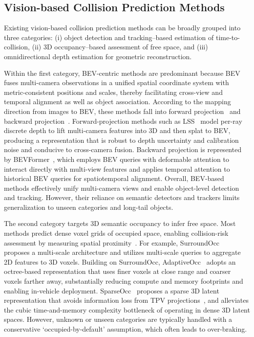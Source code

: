 \documentclass[journal]{IEEEtran}
\begin{document}
\subsection{Vision-based Collision Prediction Methods}
\label{sec:related-work1}
Existing vision-based collision prediction methods can be broadly grouped into three categories: (i) object detection and tracking–based estimation of time-to-collision, (ii) 3D occupancy–based assessment of free space, and (iii) omnidirectional depth estimation for geometric reconstruction. 

Within the first category, BEV-centric methods are predominant because BEV fuses multi-camera observations in a unified spatial coordinate system with metric-consistent positions and scales, thereby facilitating cross-view and temporal alignment as well as object association. According to the mapping direction from images to BEV, these methods fall into forward projection~\cite{philion2020lss,huang2021bevdet,huang2022bevdet4d,li2023bevdepth,li2023bevstereo,li2024fast} and backward projection~\cite{wang2022detr3d,doll2022spatialdetr,liu2022petr,li2024bevformer}. Forward-projection methods such as LSS~\cite{philion2020lss} model per-ray discrete depth to lift multi-camera features into 3D and then splat to BEV, producing a representation that is robust to depth uncertainty and calibration noise and conducive to cross-camera fusion. Backward projection is represented by BEVFormer~\cite{li2024bevformer}, which employs BEV queries with deformable attention to interact directly with multi-view features and applies temporal attention to historical BEV queries for spatiotemporal alignment. Overall, BEV-based methods effectively unify multi-camera views and enable object-level detection and tracking. However, their reliance on semantic detectors and trackers limits generalization to unseen categories and long-tail objects. 

The second category targets 3D semantic occupancy to infer free space. Most methods predict dense voxel grids of occupied space, enabling collision-risk assessment by measuring spatial proximity~\cite{wei2023surroundocc,yang2024adaptiveocc,li2023fb,huang2023tri,tang2024sparseocc,hou2024fastocc}. For example, SurroundOcc~\cite{wei2023surroundocc} proposes a multi-scale architecture and utilizes multi-scale queries to aggregate 2D features to 3D voxels. Building on SurroundOcc, AdaptiveOcc~\cite{yang2024adaptiveocc} adopts an octree-based representation that uses finer voxels at close range and coarser voxels farther away, substantially reducing compute and memory footprints and enabling in-vehicle deployment. SparseOcc~\cite{tang2024sparseocc} proposes a sparse 3D latent representation that avoids information loss from TPV projections~\cite{huang2023tri}, and alleviates the cubic time-and-memory complexity bottleneck of operating in dense 3D latent spaces. However, unknown or unseen categories are typically handled with a conservative ‘occupied-by-default’ assumption, which often leads to over-braking.
\end{document}
